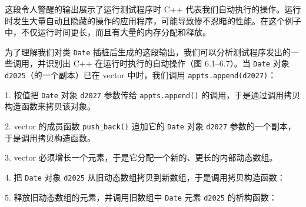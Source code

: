\par
{}\par
{}\par
{}\par
{}\par
{}\par
{}\par
{}\par

这段令人警醒的输出展示了运行测试程序时 C++ 代表我们自动执行的操作。运行时发生大量自动且隐藏的操作的应用程序，可能导致惨不忍睹的性能。在这个例子中，不仅运行时间更长，而且有大量的内存分配和释放。

为了理解我们对类 \texttt{Date} 插桩后生成的这段输出，我们可以分析测试程序发出的一些调用，并识别出 C++ 在运行时执行的自动操作（图 6.1–6.7）。当 \texttt{Date} 对象 \texttt{d2025}（的一个副本）已在 vector 中时，我们调用 \texttt{appts.\allowbreak{}append(\allowbreak{}d2027)\allowbreak{}}：

1. 按值把 \texttt{Date} 对象 \texttt{d2027} 参数传给 \texttt{appts.\allowbreak{}append(\allowbreak{})\allowbreak{}} 的调用，于是通过调用拷贝构造函数来拷贝该对象。

2. vector 的成员函数 \texttt{push\_\allowbreak{}back(\allowbreak{})\allowbreak{}} 追加它的 \texttt{Date} 对象 \texttt{d2027} 参数的一个副本，于是调用拷贝构造函数。

3. vector 必须增长一个元素，于是它分配一个新的、更长的内部动态数组。

4. 把 \texttt{Date} 对象 \texttt{d2025} 从旧动态数组拷贝到新数组，于是调用拷贝构造函数：


5. 释放旧动态数组的元素，并调用旧数组中 \texttt{Date} 元素 \texttt{d2025} 的析构函数：

